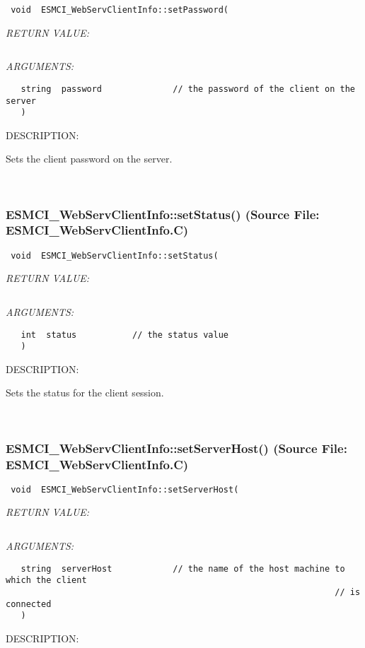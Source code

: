   
\begin{verbatim} void  ESMCI_WebServClientInfo::setPassword(\end{verbatim}{\em RETURN VALUE:}
\begin{verbatim} \end{verbatim}{\em ARGUMENTS:}
\begin{verbatim}   string  password              // the password of the client on the server
   )\end{verbatim}
{\sf DESCRIPTION:\\ }


      Sets the client password on the server.
   
 
\mbox{}\hrulefill\
 
\subsubsection{ESMCI\_WebServClientInfo::setStatus() (Source File: ESMCI\_WebServClientInfo.C)}


  
\begin{verbatim} void  ESMCI_WebServClientInfo::setStatus(\end{verbatim}{\em RETURN VALUE:}
\begin{verbatim} \end{verbatim}{\em ARGUMENTS:}
\begin{verbatim}   int  status           // the status value
   )\end{verbatim}
{\sf DESCRIPTION:\\ }


      Sets the status for the client session.
   
 
\mbox{}\hrulefill\
 
\subsubsection{ESMCI\_WebServClientInfo::setServerHost() (Source File: ESMCI\_WebServClientInfo.C)}


  
\begin{verbatim} void  ESMCI_WebServClientInfo::setServerHost(\end{verbatim}{\em RETURN VALUE:}
\begin{verbatim} \end{verbatim}{\em ARGUMENTS:}
\begin{verbatim}   string  serverHost            // the name of the host machine to which the client
                                                                 // is connected
   )\end{verbatim}
{\sf DESCRIPTION:\\ }


